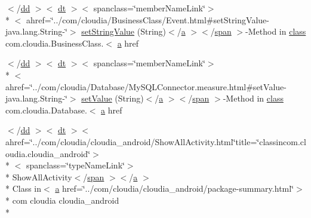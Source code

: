 \begin{DoxyCompactItemize}
\item 
$<$/\hyperlink{stylesheet_8css_a47f4718a86835a7771ec592ece845221}{dd} $>$$<$ \hyperlink{stylesheet_8css_a107565fb4039d33b041380d6e0ea1d80}{dt} $>$$<$ spanclass=\char`\"{}member\-Name\-Link\char`\"{}$>$\\*
$<$ ahref=\char`\"{}../com/cloudia/Business\-Class/Event.\-html\#set\-String\-Value-\/java.\-lang.\-String-\/\char`\"{}$>$ \hyperlink{index-17_8html_a07ba80b95cc051116233a30a7dc6679a}{set\-String\-Value} (String)$<$/\hyperlink{style_8css_a5e8981582017bb8b84c21f148345d1f7}{a} $>$$<$/\hyperlink{stylesheet_8css_a8343996ebcf16220b04e54659aac31cc}{span} $>$-\/Method in \hyperlink{_tools_8html_acf06f836132665ba8114f5a414c2403f}{class} com.\-cloudia.\-Business\-Class.$<$ \hyperlink{style_8css_a5e8981582017bb8b84c21f148345d1f7}{a} href
\item 
$<$/\hyperlink{stylesheet_8css_a47f4718a86835a7771ec592ece845221}{dd} $>$$<$ \hyperlink{stylesheet_8css_a107565fb4039d33b041380d6e0ea1d80}{dt} $>$$<$ spanclass=\char`\"{}member\-Name\-Link\char`\"{}$>$\\*
$<$ ahref=\char`\"{}../com/cloudia/Database/My\-S\-Q\-L\-Connector.\-measure.\-html\#set\-Value-\/java.\-lang.\-String-\/\char`\"{}$>$ \hyperlink{index-17_8html_a24af9a9f0ca7900b27edb30d8b5ef1e9}{set\-Value} (String)$<$/\hyperlink{style_8css_a5e8981582017bb8b84c21f148345d1f7}{a} $>$$<$/\hyperlink{stylesheet_8css_a8343996ebcf16220b04e54659aac31cc}{span} $>$-\/Method in \hyperlink{_tools_8html_acf06f836132665ba8114f5a414c2403f}{class} com.\-cloudia.\-Database.$<$ \hyperlink{style_8css_a5e8981582017bb8b84c21f148345d1f7}{a} href
\item 
$<$/\hyperlink{stylesheet_8css_a47f4718a86835a7771ec592ece845221}{dd} $>$$<$ \hyperlink{stylesheet_8css_a107565fb4039d33b041380d6e0ea1d80}{dt} $>$$<$ ahref=\char`\"{}../com/cloudia/cloudia\-\_\-android/Show\-All\-Activity.\-html\char`\"{}title=\char`\"{}classincom.\-cloudia.\-cloudia\-\_\-android\char`\"{}$>$\\*
$<$ spanclass=\char`\"{}type\-Name\-Link\char`\"{}$>$\\*
 Show\-All\-Activity$<$/\hyperlink{stylesheet_8css_a8343996ebcf16220b04e54659aac31cc}{span} $>$$<$/\hyperlink{style_8css_a5e8981582017bb8b84c21f148345d1f7}{a} $>$\\*
 Class in$<$ \hyperlink{style_8css_a5e8981582017bb8b84c21f148345d1f7}{a} href=\char`\"{}../com/cloudia/cloudia\-\_\-android/package-\/summary.\-html\char`\"{}$>$\\*
 com cloudia cloudia\-\_\-android\\*
$$
\end{DoxyCompactItemize}
